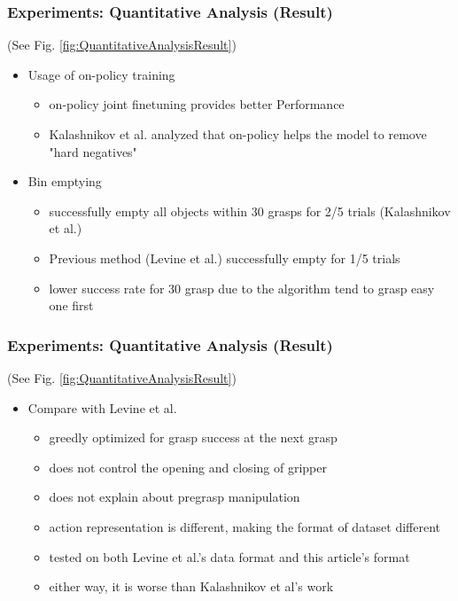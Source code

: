 \documentclass{beamer}
\newcommand{\sixthSec}{Experiments}
\begin{document}
    \begin{frame}
      \frametitle{\sixthSec: Quantitative Analysis (Result)}
      (See Fig. \ref{fig:QuantitativeAnalysisResult})
      \begin{itemize}
        \item Usage of on-policy training
        \begin{itemize}
          \item on-policy joint finetuning provides better Performance
          \item Kalashnikov et al. analyzed that on-policy helps the model to remove "hard negatives"
        \end{itemize}
        \item Bin emptying
        \begin{itemize}
          \item successfully empty all objects within 30 grasps for 2/5 trials (Kalashnikov et al.)
          \item Previous method (Levine et al.) successfully empty for 1/5 trials
          \item lower success rate for 30 grasp due to the algorithm tend to grasp easy one first
        \end{itemize}
      \end{itemize}
    \end{frame}

    \begin{frame}
      \frametitle{\sixthSec: Quantitative Analysis (Result)}
      (See Fig. \ref{fig:QuantitativeAnalysisResult})
      \begin{itemize}
        \item Compare with Levine et al.
        \begin{itemize}
          \item greedly optimized for grasp success at the next grasp
          \item does not control the opening and closing of gripper
          \item does not explain about pregrasp manipulation
          \item action representation is different, making the format of dataset different
          \item tested on both Levine et al.'s data format and this article's format
          \item either way, it is worse than Kalashnikov et al's work
        \end{itemize}
      \end{itemize}
    \end{frame}
\end{document}
